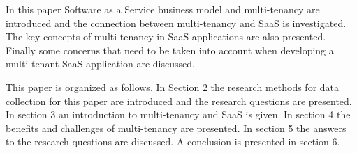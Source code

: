 \documentclass[conference]{sasmoota2017}
\begin{document}
In this paper Software as a Service business model and multi-tenancy are introduced and the connection between multi-tenancy and SaaS is investigated. The key concepts of multi-tenancy in SaaS applications are also presented. Finally some concerns that need to be taken into account when developing a multi-tenant SaaS application are discussed. 

This paper is organized as follows. In Section 2 the research methods for data collection for this paper are introduced and the research questions are presented. In section 3 an introduction to multi-tenancy and SaaS is given. In section 4 the benefits and challenges of multi-tenancy are presented. In section 5 the answers to the research questions are discussed. A conclusion is presented in section 6. 





% 
%
%
%


%
%
\end{document}
